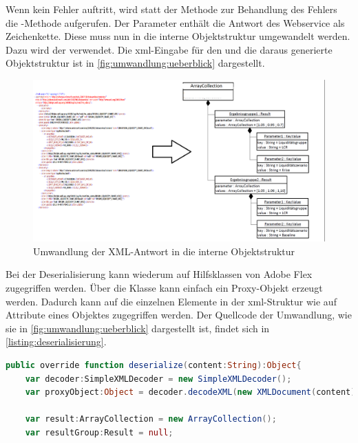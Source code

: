 \begin{onehalfspacing}
Wenn kein Fehler auftritt, wird statt der Methode zur Behandlung des Fehlers die -Methode aufgerufen. Der Parameter  enthält die Antwort des Webservice als Zeichenkette. Diese muss nun in die interne Objektstruktur umgewandelt werden. Dazu wird der   verwendet. Die \gls{xml}-Eingabe für den  und die daraus generierte Objektstruktur ist in \vref{fig:umwandlung:ueberblick} dargestellt.

\begin{figure}[!ht]
\centering
\setlength{\unitlength}{1mm}
\includegraphics[width=15cm]{images/umwandlung.png}
\caption{Umwandlung der XML-Antwort in die interne Objektstruktur\label{fig:umwandlung:ueberblick}}
\end{figure} 

Bei der Deserialisierung kann wiederum auf Hilfsklassen von Adobe Flex zugegriffen werden. Über die Klasse  kann einfach ein Proxy-Objekt erzeugt werden. Dadurch kann auf die einzelnen Elemente in der \gls{xml}-Struktur wie auf Attribute eines Objektes zugegriffen werden. Der Quellcode der Umwandlung, wie sie in \vref{fig:umwandlung:ueberblick} dargestellt ist, findet sich in \vref{listing:deserialisierung}.


\begin{programm}[h]
\begin{lstlisting}[language=ActionScript]
public override function deserialize(content:String):Object{			
	var decoder:SimpleXMLDecoder = new SimpleXMLDecoder();
	var proxyObject:Object = decoder.decodeXML(new XMLDocument(content));
	
	var result:ArrayCollection = new ArrayCollection();
	var resultGroup:Result = null;			
			

\end{lstlisting}
\end{programm}
\end{onehalfspacing}
